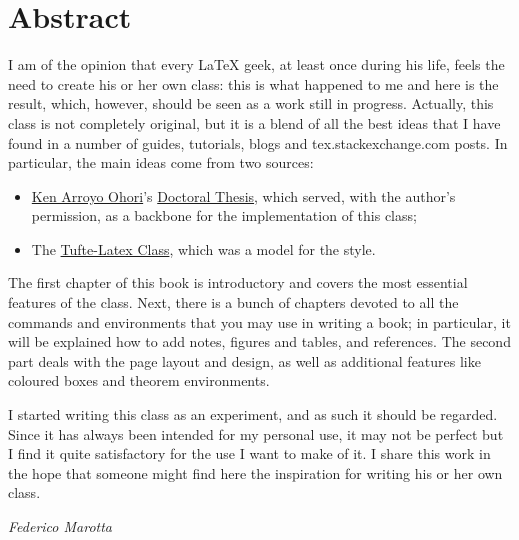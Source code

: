 \chapter*{Abstract}

I am of the opinion that every \LaTeX\xspace geek, at least once during
his life, feels the need to create his or her own class: this is what
happened to me and here is the result, which, however, should be seen as
a work still in progress. Actually, this class is not completely
original, but it is a blend of all the best ideas that I have found in a
number of guides, tutorials, blogs and tex.stackexchange.com posts. In
particular, the main ideas come from two sources:

\begin{itemize}
	\item \href{https://3d.bk.tudelft.nl/ken/en/}{Ken Arroyo Ohori}'s
	      \href{https://3d.bk.tudelft.nl/ken/en/nl/ken/en/2016/04/17/a-1.5-column-layout-in-latex.html}{Doctoral
		      Thesis}, which served, with the author's permission, as a backbone
	      for the implementation of this class;
	\item The
	      \href{https://github.com/Tufte-LaTeX/tufte-latex}{Tufte-Latex
		      Class}, which was a model for the style.
\end{itemize}

The first chapter of this book is introductory and covers the most
essential features of the class. Next, there is a bunch of chapters
devoted to all the commands and environments that you may use in writing
a book; in particular, it will be explained how to add notes, figures
and tables, and references. The second part deals with the page layout
and design, as well as additional features like coloured boxes and
theorem environments.

I started writing this class as an experiment, and as such it should be
regarded. Since it has always been intended for my personal use, it may
not be perfect but I find it quite satisfactory for the use I want to
make of it. I share this work in the hope that someone might find here
the inspiration for writing his or her own class.

\begin{flushright}
	\textit{Federico Marotta}
\end{flushright}
